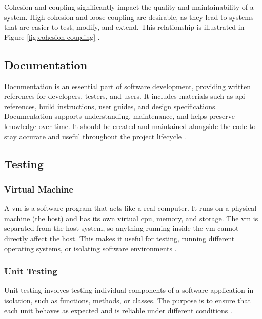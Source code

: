 Cohesion and coupling significantly impact the quality and maintainability of a system.
High cohesion and loose coupling are desirable, as they lead to systems that are easier to test, modify, and extend. This relationship is illustrated in Figure \ref{fig:cohesion-coupling} 
\cite{geeksforgeeks:c&c}.

\subsection{Documentation}
\label{subsec:documentation}

Documentation is an essential part of software development, providing written references for developers, testers, and users. It includes materials such as \gls{api} references, build instructions, user guides, and design specifications. Documentation supports understanding, maintenance, and helps preserve knowledge over time. It should be created and maintained alongside the code to stay accurate and useful throughout the project lifecycle \cite{geeksforgeeks:doc}.

\subsection{Testing}
\label{subsec:testing}

\subsubsection*{Virtual Machine}
\label{subsubsec:virtual-machine}

A \gls{vm} is a software program that acts like a real computer. It runs on a physical machine (the host) and has its own virtual \gls{cpu}, memory, and storage. The \gls{vm} is separated from the host system, so anything running inside the \gls{vm} cannot directly affect the host. This makes it useful for testing, running different operating systems, or isolating software environments \cite{microsoft:virtual-machine}.

\subsubsection*{Unit Testing}
\label{subsubsec:unit-testing}

Unit testing involves testing individual components of a software application in isolation, such as functions, methods, or classes. The purpose is to ensure that each unit behaves as expected and is reliable under different conditions \cite{geeksforgeeks:unit-test}.

